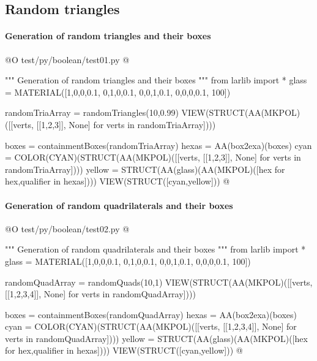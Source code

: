 \documentclass[11pt,oneside]{article}    %
\begin{document}
\subsection{Random triangles}


\paragraph{Generation of random triangles and their boxes}
@O test/py/boolean/test01.py
@{""" Generation of random triangles and their boxes """
from larlib import *
glass = MATERIAL([1,0,0,0.1,  0,1,0,0.1,  0,0,1,0.1, 0,0,0,0.1, 100])

randomTriaArray = randomTriangles(10,0.99)
VIEW(STRUCT(AA(MKPOL)([[verts, [[1,2,3]], None] for verts in randomTriaArray])))

boxes = containmentBoxes(randomTriaArray)
hexas = AA(box2exa)(boxes)
cyan = COLOR(CYAN)(STRUCT(AA(MKPOL)([[verts, [[1,2,3]], None] for verts in randomTriaArray])))
yellow = STRUCT(AA(glass)(AA(MKPOL)([hex for hex,qualifier in hexas])))
VIEW(STRUCT([cyan,yellow]))
@}


\paragraph{Generation of random quadrilaterals and their boxes}
@O test/py/boolean/test02.py
@{""" Generation of random quadrilaterals and their boxes """
from larlib import *
glass = MATERIAL([1,0,0,0.1,  0,1,0,0.1,  0,0,1,0.1, 0,0,0,0.1, 100])

randomQuadArray = randomQuads(10,1)
VIEW(STRUCT(AA(MKPOL)([[verts, [[1,2,3,4]], None] for verts in randomQuadArray])))

boxes = containmentBoxes(randomQuadArray)
hexas = AA(box2exa)(boxes)
cyan = COLOR(CYAN)(STRUCT(AA(MKPOL)([[verts, [[1,2,3,4]], None] for verts in randomQuadArray])))
yellow = STRUCT(AA(glass)(AA(MKPOL)([hex for hex,qualifier in hexas])))
VIEW(STRUCT([cyan,yellow]))
@}
\end{document}
